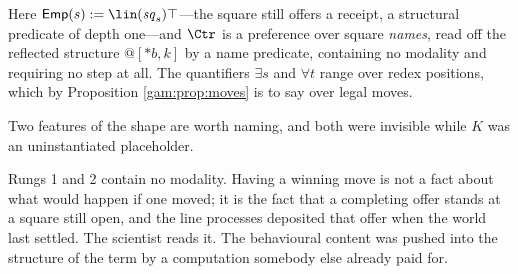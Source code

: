 \begin{center}
\end{center}

Here $\mathsf{Emp}(s) := \lin(\mathit{sq}_s)\top$---the square still offers a
receipt, a structural predicate of depth one---and $\Ctr$ is a preference over
square \emph{names}, read off the reflected structure $@[*b,k]$ by a name
predicate, containing no modality and requiring no step at all. The quantifiers
$\exists s$ and $\forall t$ range over redex positions, which by Proposition
\ref{gam:prop:moves} is to say over legal moves.

Two features of the shape are worth naming, and both were invisible while $K$
was an uninstantiated placeholder.

\begin{observation}\label{gam:winning-blocking-perception-lookahead}
Rungs 1 and 2 contain no modality. Having a winning move is not a fact about
what would happen if one moved; it is the fact that a completing offer stands at
a square still open, and the line processes deposited that offer when the world
last settled. The scientist reads it. The behavioural content was pushed into
the structure of the term by a computation somebody else already paid for.
\end{observation}

